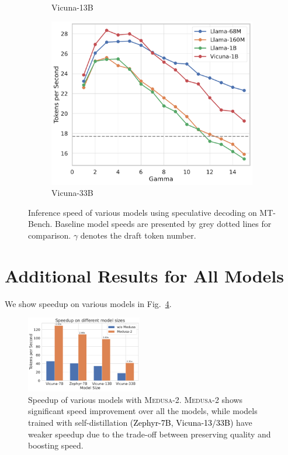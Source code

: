 \documentclass{article}
\theoremstyle{plain}
\theoremstyle{definition}
\theoremstyle{remark}
\newcommand{\ours}
{\textsc{Medusa}\xspace}
\begin{document}
\begin{figure}[h]
\begin{subfigure}[b]{0.32\textwidth}
         \caption{Vicuna-13B}
         \label{fig:spec13b}
     \end{subfigure}
    \begin{subfigure}[b]{0.32\textwidth}
         \centering
         \includegraphics[width=\textwidth]{spec_33b.pdf}
         \caption{Vicuna-33B}
         \label{fig:spec33b}
     \end{subfigure}
        \caption{Inference speed of various models using speculative decoding on MT-Bench. Baseline model speeds are presented by grey dotted lines for comparison. $\gamma$ denotes the draft token number.}
        \label{fig:speculative_decoding}
\end{figure}

\section{Additional Results for All Models}\label{appendix:add_results}
We show speedup on various models in Fig.~\ref{fig:speedup_model_wild}.
\begin{figure}[h]
    \centering
    \includegraphics[width=0.45\textwidth]{speedup_model_wild_wide.pdf}
    \caption{Speedup of various models with \ours-2. \ours-2 shows significant speed improvement over all the models, while models trained with self-distillation \textcolor{black}{(Zephyr-7B, Vicuna-13/33B)} have weaker speedup due to the trade-off between preserving quality and boosting speed.}
    \label{fig:speedup_model_wild}
\end{figure}
\end{document}
